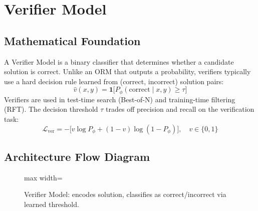 \documentclass{article}
\begin{document}
\newpage
\section{Verifier Model}

\subsection{Mathematical Foundation}
A Verifier Model is a binary classifier that determines whether a candidate solution is correct. Unlike an ORM that outputs a probability, verifiers typically use a hard decision rule learned from (correct, incorrect) solution pairs:
\begin{equation}
  \hat{v}(x, y) = \mathbf{1}\bigl[P_\phi(\text{correct} \mid x, y) \geq \tau\bigr]
\end{equation}
Verifiers are used in test-time search (Best-of-N) and training-time filtering (RFT). The decision threshold $\tau$ trades off precision and recall on the verification task:
\begin{equation}
  \mathcal{L}_{\text{ver}} = -\bigl[v\log P_\phi + (1-v)\log(1-P_\phi)\bigr],\quad v \in \{0,1\}
\end{equation}

\subsection{Architecture Flow Diagram}

\begin{figure}[h]
\centering
\begin{adjustbox}{max width=\linewidth}
\end{adjustbox}
\caption{Verifier Model: encodes solution, classifies as correct/incorrect via learned threshold.}
\end{figure}
\end{document}
